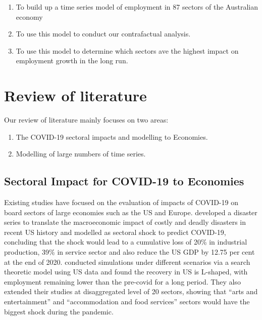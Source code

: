 \documentclass[11pt,a4paper,]{article}
\begin{document}
\begin{enumerate}
\def\labelenumi{\arabic{enumi}.}
\item
  To build up a time series model of employment in 87 sectors of the Australian economy
\item
  To use this model to conduct our contrafactual analysis.
\item
  To use this model to determine which sectors ave the highest impact on employment growth in the long run.
\end{enumerate}

\newpage

\hypertarget{review-of-literature}{%
\section{Review of literature}\label{review-of-literature}}

Our review of literature mainly focuses on two areas:

\begin{enumerate}
\def\labelenumi{\arabic{enumi}.}
\item
  The COVID-19 sectoral impacts and modelling to Economies.
\item
  Modelling of large numbers of time series.
\end{enumerate}

\hypertarget{sectoral-impact-for-covid-19-to-economies}{%
\subsection{Sectoral Impact for COVID-19 to Economies}\label{sectoral-impact-for-covid-19-to-economies}}

Existing studies have focused on the evaluation of impacts of COVID-19 on board sectors of large economies such as the US and Europe. \textcite{ludvigson2020covid} developed a disaster series to translate the macroeconomic impact of costly and deadly disasters in recent US history and modelled as sectoral shock to predict COVID-19, concluding that the shock would lead to a cumulative loss of 20\% in industrial production, 39\% in service sector and also reduce the US GDP by 12.75 per cent at the end of 2020. \textcite{gregory2020pandemic} conducted simulations under different scenarios via a search theoretic model using US data and found the recovery in US is L-shaped, with employment remaining lower than the pre-covid for a long period. They also extended their studies at disaggregated level of 20 sectors, showing that ``arts and entertainment'' and ``accommodation and food services'' sectors would have the biggest shock during the pandemic.
\end{document}
